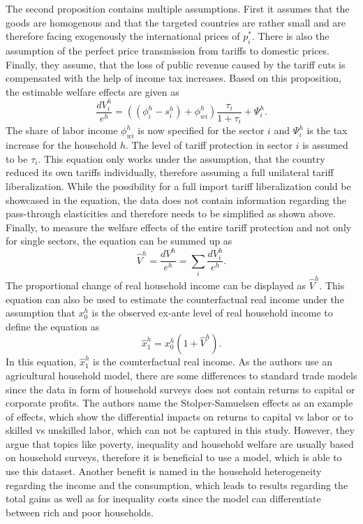 The second proposition contains multiple assumptions. First it assumes that the goods are homogenous and that the 
targeted countries are rather small and are therefore facing exogenously the international prices of \(p_{i}^*\). There is also
the assumption of the perfect price transmission from tariffs to domestic prices. Finally, they assume, that the loss of public
revenue caused by the tariff cuts is compensated with the help of income tax increases. Based on this proposition, the estimable
welfare effects are given as
\begin{equation} \label{eq:equation5}
    \frac{dV_{i}^h}{e^h}=((\phi_{i}^h-s_{i}^h)+\phi_{wi}^h) \frac{\tau_{i}}{1+\tau_{i}}+\Psi_{i}^h.
\end{equation}
The share of labor income \(\phi_{wi}^h\) is now specified for the sector \(i\) and \(\Psi_{i}^h\) is the tax increase for the
household \(h\). The level of tariff protection in sector \(i\) is assumed to be \(\tau_{i}\).
This equation only works under the assumption, that the country reduced its own tariffs individually, therefore assuming a full
unilateral tariff liberalization. While the possibility for a full import tariff liberalization could be showcased in the equation,
the data does not contain information regarding the pass-through elasticities and therefore needs to be simplified as shown
above.
Finally, to measure the welfare effects of the entire tariff protection and not only for single sectors, the equation
can be summed up as 
\begin{equation} \label{eq:equation7}
    \hat{V}^h = \frac{dV^h}{e^h} = \sum_{i} \frac{dV_{i}^h}{e^h}.
\end{equation}
The proportional change of real household income can be displayed as \(\hat{V}^h\). This equation can also be used to estimate
the counterfactual real income under the assumption that \(x_{0}^h\) is the observed ex-ante level of real household income to
define the equation as 
\begin{equation} \label{eq:equation8}
    \hat{x}_{1}^h = x_{0}^h(1+\hat{V}^h).
\end{equation}
In this equation, \(\hat{x}_{1}^h\) is the counterfactual real income.
As the authors use an agricultural household model, there are some differences to standard trade models since the data in form
of household surveys does not contain returns to capital or corporate profits. The authors name the Stolper-Samuelsen effects
as an example of effects, which show the differential impacts on returns to capital vs labor or to skilled vs unskilled labor, 
which can not be captured in this study. However, they argue that topics like poverty, inequality and household welfare are
usually based on household surveys, therefore it is beneficial to use a model, which is able to use this dataset. Another
benefit is named in the household heterogeneity regarding the income and the consumption, which leads to results regarding the
total gains as well as for inequality costs since the model can differentiate between rich and poor households.\\

